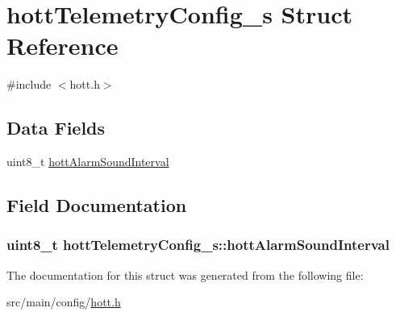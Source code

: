 \hypertarget{structhottTelemetryConfig__s}{\section{hott\+Telemetry\+Config\+\_\+s Struct Reference}
\label{structhottTelemetryConfig__s}
}


{\ttfamily \#include $<$hott.\+h$>$}

\subsection*{Data Fields}
\begin{DoxyCompactItemize}
\item 
uint8\+\_\+t \hyperlink{structhottTelemetryConfig__s_a47d75ffbede5e94d4c240c092ec680ce}{hott\+Alarm\+Sound\+Interval}
\end{DoxyCompactItemize}


\subsection{Field Documentation}
\hypertarget{structhottTelemetryConfig__s_a47d75ffbede5e94d4c240c092ec680ce}{
\subsubsection[{hott\+Alarm\+Sound\+Interval}]{\setlength{\rightskip}{0pt plus 5cm}uint8\+\_\+t hott\+Telemetry\+Config\+\_\+s\+::hott\+Alarm\+Sound\+Interval}}\label{structhottTelemetryConfig__s_a47d75ffbede5e94d4c240c092ec680ce}


The documentation for this struct was generated from the following file\+:\begin{DoxyCompactItemize}
\item 
src/main/config/\hyperlink{config_2hott_8h}{hott.\+h}\end{DoxyCompactItemize}
